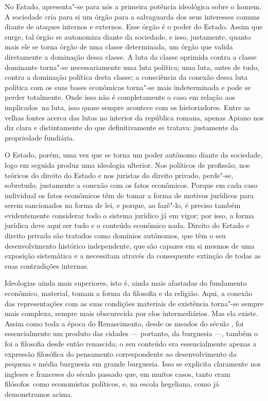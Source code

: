 No Estado, apresenta"-se para nós a primeira potência 
ideológica sobre o homem. A sociedade cria para si um órgão para a
salvaguarda dos seus interesses comuns diante de ataques internos e
externos. Esse órgão é o poder do Estado. Assim que  
surge, tal órgão se autonomiza diante da sociedade, e isso, justamente,
quanto mais ele se torna órgão de uma classe determinada, um órgão que
valida diretamente a dominação dessa classe. A luta da classe oprimida
contra a classe dominante torna"-se necessariamente uma luta política;
uma luta, antes de tudo, contra a dominação política desta classe; a
consciência da conexão dessa luta política com os suas bases
econômicas torna"-se mais indeterminada  
e pode se perder totalmente. Onde isso não é  
completamente o caso em relação aos implicados\est\ na luta, isso quase %
sempre acontece com os historiadores. Entre as velhas fontes acerca das
lutas no interior da república romana, apenas Apiano nos diz clara e distintamente do que definitivamente se tratava: justamente da
propriedade fundiária.

O Estado, porém, uma vez que se torna um poder autônomo  
diante da sociedade, logo em seguida produz uma ideologia ulterior. Nos
políticos de profissão, nos teóricos do direito do Estado e nos juristas
do direito privado, perde"-se, sobretudo, justamente a conexão com os %
fatos econômicos. Porque em cada caso individual os fatos econômicos têm
de tomar a forma de motivos jurídicos para serem sancionados na forma de
lei, e porque, ao fazê"-lo, é preciso também evidentemente considerar
todo o sistema jurídico já em vigor; por isso, a forma jurídica deve
aqui ser tudo e o conteúdo econômico nada. Direito do Estado e direito
privado são tratados como domínios autônomos, que têm o seu
desenvolvimento histórico independente, que são capazes em si mesmos de
uma exposição sistemática e a necessitam através da consequente extinção
de todas as suas contradições internas.

Ideologias ainda mais superiores, isto é, ainda mais afastadas do
fundamento econômico, material, tomam a forma da filosofia e da
religião. Aqui, a conexão das representações com as suas condições
materiais de existência torna"-se sempre mais complexa, sempre mais
obscurecida por elos intermediários. Mas ela existe. Assim como toda a
época do Renascimento, desde os meados do século , foi essencialmente
um produto das cidades --- portanto, da burguesia ---, também o foi a filosofia
desde então renascida; o seu conteúdo era essencialmente apenas a
expressão filosófica do pensamento correspondente ao desenvolvimento da
pequena e média burguesia em grande burguesia. Isso se explicita
claramente nos ingleses e franceses do século passado que, em muitos
casos, tanto eram filósofos\est\ como economistas políticos, e, na escola %
hegeliana, como já demonstramos acima.

